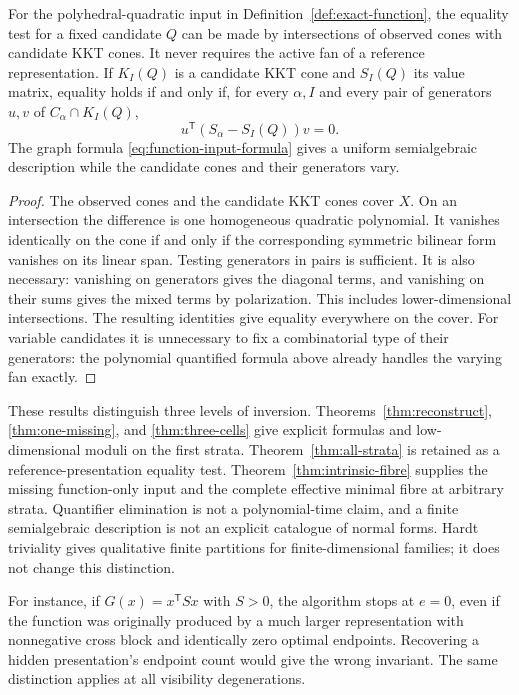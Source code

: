 \begin{proposition}\label{prop:intrinsic-atlas}
For the polyhedral-quadratic input in Definition~\ref{def:exact-function}, the equality test for a fixed candidate $Q$ can be made by intersections of observed cones with candidate KKT cones. It never requires the active fan of a reference representation. If $K_I(Q)$ is a candidate KKT cone and $S_I(Q)$ its value matrix, equality holds if and only if, for every $\alpha,I$ and every pair of generators $u,v$ of $C_\alpha\cap K_I(Q)$,
\begin{equation}\label{eq:atlas-comparison}
 u^{\mathsf T}(S_\alpha-S_I(Q))v=0.
\end{equation}
The graph formula \eqref{eq:function-input-formula} gives a uniform semialgebraic description while the candidate cones and their generators vary.
\end{proposition}
\begin{proof}
The observed cones and the candidate KKT cones cover $X$. On an intersection the difference is one homogeneous quadratic polynomial. It vanishes identically on the cone if and only if the corresponding symmetric bilinear form vanishes on its linear span. Testing generators in pairs is sufficient. It is also necessary: vanishing on generators gives the diagonal terms, and vanishing on their sums gives the mixed terms by polarization. This includes lower-dimensional intersections. The resulting identities give equality everywhere on the cover. For variable candidates it is unnecessary to fix a combinatorial type of their generators: the polynomial quantified formula above already handles the varying fan exactly.
\end{proof}

These results distinguish three levels of inversion. Theorems~\ref{thm:reconstruct}, \ref{thm:one-missing}, and \ref{thm:three-cells} give explicit formulas and low-dimensional moduli on the first strata. Theorem~\ref{thm:all-strata} is retained as a reference-presentation equality test. Theorem~\ref{thm:intrinsic-fibre} supplies the missing function-only input and the complete effective minimal fibre at arbitrary strata. Quantifier elimination is not a polynomial-time claim, and a finite semialgebraic description is not an explicit catalogue of normal forms. Hardt triviality gives qualitative finite partitions for finite-dimensional families; it does not change this distinction.

For instance, if $G(x)=x^{\mathsf T}Sx$ with $S>0$, the algorithm stops at $e=0$, even if the function was originally produced by a much larger representation with nonnegative cross block and identically zero optimal endpoints. Recovering a hidden presentation's endpoint count would give the wrong invariant. The same distinction applies at all visibility degenerations.
